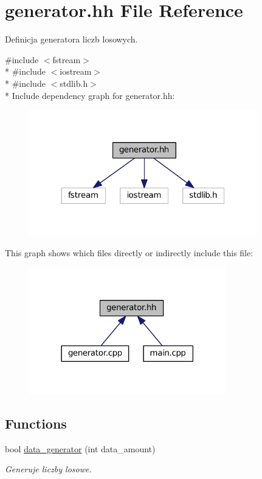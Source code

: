 \hypertarget{generator_8hh}{}\section{generator.\+hh File Reference}
\label{generator_8hh}


Definicja generatora liczb losowych.  


{\ttfamily \#include $<$fstream$>$}\\*
{\ttfamily \#include $<$iostream$>$}\\*
{\ttfamily \#include $<$stdlib.\+h$>$}\\*
Include dependency graph for generator.\+hh\+:\nopagebreak
\begin{figure}[H]
\begin{center}
\leavevmode
\includegraphics[width=281pt]{dc/d66/generator_8hh__incl}
\end{center}
\end{figure}
This graph shows which files directly or indirectly include this file\+:\nopagebreak
\begin{figure}[H]
\begin{center}
\leavevmode
\includegraphics[width=242pt]{d3/d8b/generator_8hh__dep__incl}
\end{center}
\end{figure}
\subsection*{Functions}
\begin{DoxyCompactItemize}
\item 
bool \hyperlink{generator_8hh_a6c501967035e575874570ef71d23f3af}{data\+\_\+generator} (int data\+\_\+amount)
\begin{DoxyCompactList}\small\item\em Generuje liczby losowe. \end{DoxyCompactList}\end{DoxyCompactItemize}


